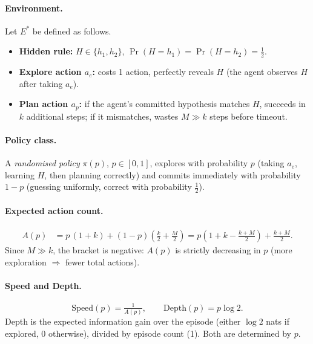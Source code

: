 \documentclass[11pt]{article}
\begin{document}
\paragraph{Environment.} Let $E^*$ be defined as follows.
\begin{itemize}[leftmargin=*]
\item \textbf{Hidden rule:} $H \in \{h_1, h_2\}$, $\Pr(H{=}h_1) = \Pr(H{=}h_2) = \tfrac{1}{2}$.
\item \textbf{Explore action $a_e$:} costs 1 action, perfectly reveals $H$ (the agent observes $H$ after taking $a_e$).
\item \textbf{Plan action $a_p$:} if the agent's committed hypothesis matches $H$, succeeds in $k$ additional steps; if it mismatches, wastes $M \gg k$ steps before timeout.
\end{itemize}

\paragraph{Policy class.} A \emph{randomised policy} $\pi(p)$, $p \in [0,1]$, explores with probability $p$ (taking $a_e$, learning $H$, then planning correctly) and commits immediately with probability $1-p$ (guessing uniformly, correct with probability $\tfrac{1}{2}$).

\paragraph{Expected action count.}
\begin{align}
A(p) &= p\,(1+k) + (1-p)\!\left(\tfrac{k}{2} + \tfrac{M}{2}\right)
     = p\!\left(1+k - \tfrac{k+M}{2}\right) + \tfrac{k+M}{2}.
\label{eq:A}
\end{align}
Since $M \gg k$, the bracket is negative: $A(p)$ is strictly decreasing in $p$ (more exploration $\Rightarrow$ fewer total actions).

\paragraph{Speed and Depth.}
\begin{equation}
\mathrm{Speed}(p) = \tfrac{1}{A(p)}, \qquad
\mathrm{Depth}(p) = p\log 2.
\label{eq:SD-appendix}
\end{equation}
Depth is the expected information gain over the episode (either $\log 2$ nats if explored, 0 otherwise), divided by episode count (1). Both are determined by $p$.
\end{document}

